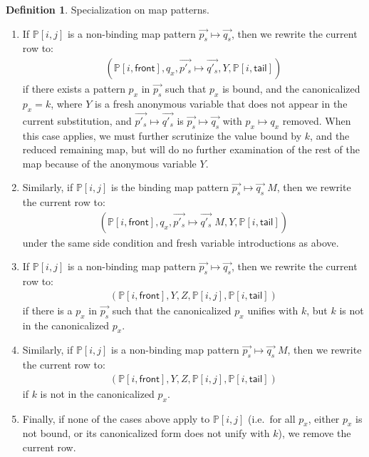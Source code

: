 \documentclass{article}
\theoremstyle{definition}
\newtheorem{definition}{Definition}[section]
\newcommand{\PP}{\mathbb{P}}
\newcommand{\front}{\mathsf{front}}
\newcommand{\tail}{\mathsf{tail}}
\newcommand{\mapp}{\vec{p_s} \mapsto \vec{q_s}}
\newcommand{\mappPrime}{\vec{p'_s} \mapsto \vec{q'_s}}
\begin{document}
\begin{definition}{Specialization on map patterns.}
\begin{enumerate}

  \item If $ \PP[i, j] $ is a non-binding map pattern $ \mapp $, then we rewrite
    the current row to:
    \begin{align*}
      (\PP[i, \front], q_x, \mappPrime , Y, \PP[i, \tail])
    \end{align*}
    if there exists a pattern $ p_x $ in $ \vec{p_s} $ such that $ p_x $ is
    bound, and the canonicalized $ p_x = k $, where $ Y $ is a fresh anonymous
    variable that does not appear in the current substitution, and $ \mappPrime
    $ is $ \mapp $ with $ p_x \mapsto q_x $ removed. When this case applies, we
    must further scrutinize the value bound by $ k $, and the reduced remaining
    map, but will do no further examination of the rest of the map because of
    the anonymous variable $ Y $.

  \item Similarly, if $ \PP[i, j] $ is the binding map pattern $ \mapp \; M $,
    then we rewrite the current row to:
    \begin{align*}
      (\PP[i, \front], q_x, \mappPrime \; M , Y, \PP[i, \tail])
    \end{align*}
    under the same side condition and fresh variable introductions as above.

  \item If $ \PP[i, j] $ is a non-binding map pattern $ \mapp $, then we rewrite
    the current row to:
    \begin{align*}
      (\PP[i, \front], Y, Z, \PP[i, j], \PP[i, \tail])
    \end{align*}
    if there is a $ p_x $ in $ \vec{p_s} $ such that the canonicalized $ p_x $
    unifies with $ k $, but $ k $ is not in the canonicalized $ p_x $.

  \item Similarly, if $ \PP[i, j] $ is a non-binding map pattern $ \mapp \; M $,
    then we rewrite the current row to:
    \begin{align*}
      (\PP[i, \front], Y, Z, \PP[i, j], \PP[i, \tail])
    \end{align*}
    if $ k $ is not in the canonicalized $ p_x $.

  \item Finally, if none of the cases above apply to $ \PP[i, j] $ (i.e.\ for
    all $ p_x $, either $ p_x $ is not bound, or its canonicalized form does not
    unify with $ k $), we remove the current row.


\end{enumerate}
\end{definition}
\end{document}
